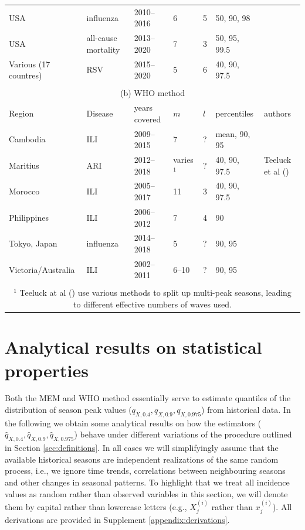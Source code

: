 \documentclass{article}
\begin{document}
\begin{table}[h!]
\begin{tabular}{l l l l l l l}
USA & influenza & 2010--2016 & 6 & 5 & 50, 90, 98 & \cite{Dahlgren2019}\\
USA & all-cause mortality & 2013--2020 & 7 & 3 & 50, 95, 99.5 & \cite{Dahlgren2022}\\
Various (17 countres) & RSV & 2015--2020 & 5 & 6 & 40, 90, 97.5 & \cite{Wang2023} \\ %
\midrule \\
\multicolumn{7}{c}{(b) WHO method}\\
\toprule
Region & Disease & years covered & $m$ & $l$ & percentiles & authors\\
\midrule
Cambodia & ILI & 2009--2015 & 7 & ? & mean, 90, 95 & \cite{Ly2017}\\
Maritius & ARI & 2012--2018 & varies$^1$ & ? & 40, 90, 97.5 & Teeluck et al (\citeyear{Teeluck2021}) \\
Morocco & ILI & 2005--2017 & 11 & 3 & 40, 90, 97.5 & \cite{Rguig2020}\\
Philippines & ILI & 2006--2012 & 7 & 4 & 90 & \cite{Lucero2016}\\
Tokyo, Japan & influenza & 2014--2018 & 5 & ? & 90, 95 & \cite{Matsuda2022} \\
Victoria/Australia & ILI & 2002--2011 & 6--10 & ? & 90, 95 & \cite{Tay2013}\\
\bottomrule\\
\multicolumn{7}{c}{$^1$ Teeluck at al (\citeyear{Teeluck2021}) use various methods to split up multi-peak seasons, leading to different effective numbers of waves used.}\\ 
\end{tabular}
\end{table}



\section{Analytical results on statistical properties}
\label{sec:analytical_results}

Both the MEM and WHO method essentially serve to estimate quantiles of the distribution of season peak values ($q_{X, 0.4}, q_{X, 0.9}, q_{X, 0.975}$) from historical data. In the following we obtain some analytical results on how the estimators ($\hat{q}_{X, 0.4}, \hat{q}_{X, 0.9}, \hat{q}_{X, 0.975}$) behave under different variations of the procedure outlined in Section \ref{sec:definitions}. In all cases we will simplifyingly assume that the available historical seasons are independent realizations of the same random process, i.e., we ignore time trends, correlations between neighbouring seasons and other changes in seasonal patterns. To highlight that we treat all incidence values as random rather than observed variables in this section, we will denote them by capital rather than lowercase letters (e.g., $X_j^{(i)}$ rather than $x_j^{(i)}$). All derivations are provided in Supplement \ref{appendix:derivations}.
\end{document}
